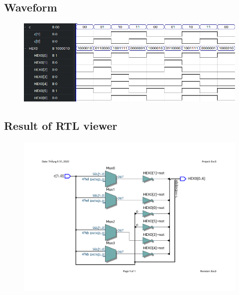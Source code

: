 \documentclass[13pt,a4paper]{report}
\begin{document}
\subsection{Waveform}
\begin{figure}[H]
\centering
\includegraphics[scale=0.8]{images/Exc3_waveform.png}
\end{figure}

\subsection{Result of RTL viewer}
\begin{figure}[H]
\centering
\includegraphics[scale=0.7, clip, trim={2cm 4cm 2cm 3cm}]{images/Exc3_RTL.pdf}
\end{figure}
\end{document}
